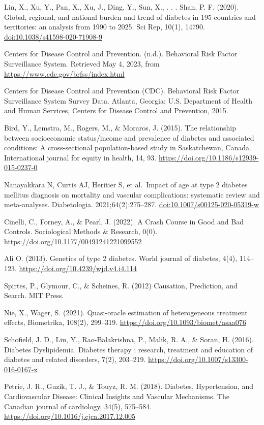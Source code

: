 \documentclass[
  12pt,
]{article}
\begin{document}
Lin, X., Xu, Y., Pan, X., Xu, J., Ding, Y., Sun, X., . . . Shan, P. F.
(2020). Global, regional, and national burden and trend of diabetes in
195 countries and territories: an analysis from 1990 to 2025. Sci Rep,
10(1), 14790. \url{doi:10.1038/s41598-020-71908-9}

Centers for Disease Control and Prevention. (n.d.). Behavioral Risk
Factor Surveillance System. Retrieved May 4, 2023, from
\url{https://www.cdc.gov/brfss/index.html}

Centers for Disease Control and Prevention (CDC). Behavioral Risk Factor
Surveillance System Survey Data. Atlanta, Georgia: U.S. Department of
Health and Human Services, Centers for Disease Control and Prevention,
2015.

Bird, Y., Lemstra, M., Rogers, M., \& Moraros, J. (2015). The
relationship between socioeconomic status/income and prevalence of
diabetes and associated conditions: A cross-sectional population-based
study in Saskatchewan, Canada. International journal for equity in
health, 14, 93. \url{https://doi.org/10.1186/s12939-015-0237-0}

Nanayakkara N, Curtis AJ, Heritier S, et al.~Impact of age at type 2
diabetes mellitus diagnosis on mortality and vascular complications:
systematic review and meta-analyses. Diabetologia. 2021;64(2):275--287.
\url{doi:10.1007/s00125-020-05319-w}

Cinelli, C., Forney, A., \& Pearl, J. (2022). A Crash Course in Good and
Bad Controls. Sociological Methods \& Research, 0(0).
\url{https://doi.org/10.1177/00491241221099552}

Ali O. (2013). Genetics of type 2 diabetes. World journal of diabetes,
4(4), 114--123. \url{https://doi.org/10.4239/wjd.v4.i4.114}

Spirtes, P., Glymour, C., \& Scheines, R. (2012) Causation, Prediction,
and Search. MIT Press.

Nie, X., Wager, S. (2021). Quasi-oracle estimation of heterogeneous
treatment effects, Biometrika, 108(2), 299--319.
\url{https://doi.org/10.1093/biomet/asaa076}

Schofield, J. D., Liu, Y., Rao-Balakrishna, P., Malik, R. A., \& Soran,
H. (2016). Diabetes Dyslipidemia. Diabetes therapy : research, treatment
and education of diabetes and related disorders, 7(2), 203--219.
\url{https://doi.org/10.1007/s13300-016-0167-x}

Petrie, J. R., Guzik, T. J., \& Touyz, R. M. (2018). Diabetes,
Hypertension, and Cardiovascular Disease: Clinical Insights and Vascular
Mechanisms. The Canadian journal of cardiology, 34(5), 575--584.
\url{https://doi.org/10.1016/j.cjca.2017.12.005}
\end{document}

